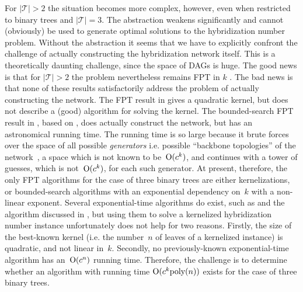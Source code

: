 For $|\mathcal{T}| > 2$ the situation becomes more complex, however, even when restricted to binary trees %
and $|\mathcal{T}|=3$. The \maaf abstraction weakens significantly and cannot (obviously) be used to generate optimal solutions to the hybridization number problem.  Without the \maaf abstraction it seems that we have to explicitly confront the challenge of actually constructing the hybridization network itself. This is a theoretically daunting challenge, since the space of DAGs is huge. The good news is that for $|\mathcal{T}|>2$ the problem nevertheless remains FPT in $k$ \cite{vanIerselLinz,towards}. The bad news is that none of these results satisfactorily address the problem of actually constructing the network. The FPT result in \cite{vanIerselLinz} gives a quadratic kernel, but does not describe a (good) algorithm for solving the kernel. The bounded-search FPT result in \cite{towards}, based on \cite{KelkScornavacca2011}, does actually construct the network, but has an astronomical running time. The running time is so large because it brute forces over the space of all possible \emph{generators} i.e. possible ``backbone topologies'' of the network~\cite{elusiveness,KelkScornavacca2011}, a space which is not known to be~$\mathrm{O}(c^k)$, and continues with a tower of guesses, which is not~$\mathrm{O}(c^k)$, for each such generator. At present, therefore, the only FPT algorithms for the case of three binary trees are either kernelizations, or bounded-search algorithms with an exponential dependency on~$k$ with a non-linear exponent. Several exponential-time algorithms do exist, such as \cite{wu2013algorithm} and the algorithm discussed in \cite{vanIerselLinz}, but using them to solve a kernelized hybridization number instance unfortunately does not help for two reasons. Firstly, the size of the best-known kernel (i.e. the number~$n$ of leaves of a kernelized instance) is quadratic, and not linear in~$k$. Secondly, no previously-known exponential-time algorithm has an~$\mathrm{O}(c^n)$ running time. Therefore, the challenge is to determine whether an algorithm with running time $\mathrm{O}(c^k \text{poly}(n))$ exists for the case of three binary trees.

